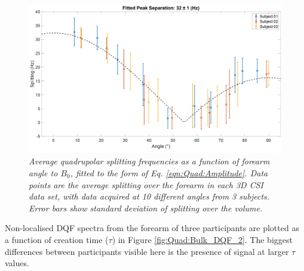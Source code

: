 \begin{figure}
    \centering
    \includegraphics[width=1\textwidth]{Figures/Quad/Split_Angle_2.png}
    \caption{\textit{Average quadrupolar splitting frequencies as a function of forearm angle to $B_0$, fitted to the form of Eq. \ref{eqn:Quad:Amplitude}. Data points are the average splitting over the forearm in each 3D \ac{CSI} data set, with data acquired at 10 different angles from 3 subjects. Error bars show standard deviation of splitting over the volume.}}
    \label{fig:Quad:Split_Angle_2}
\end{figure}

Non-localised \ac{DQF} spectra from the forearm of three participants are plotted as a function of creation time ($\tau$) in Figure \ref{fig:Quad:Bulk_DQF_2}. The biggest differences between participants visible here is the presence of signal at larger $\tau$ values.

